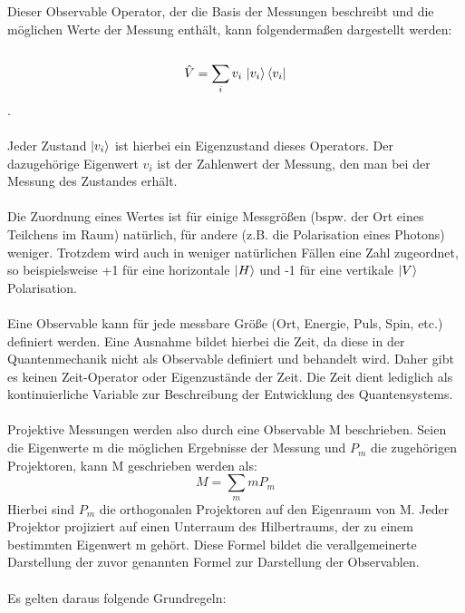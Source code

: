 Dieser Observable Operator, der die Basis der Messungen beschreibt und die möglichen Werte der Messung enthält, kann folgendermaßen dargestellt werden: \\
\\
\begin{equation}
\hat{V} = \sum_i v_i \, \ket{v_i}\bra{v_i}
\end{equation}.
\\ 
\\
Jeder Zustand $\ket{v_i}$ ist hierbei ein Eigenzustand dieses Operators. Der dazugehörige Eigenwert $v_i$ ist der Zahlenwert der Messung, den man bei der Messung des Zustandes erhält. \\ 
\\
Die Zuordnung eines Wertes ist für einige Messgrößen (bspw. der Ort eines Teilchens im Raum) natürlich, für andere (z.B. die Polarisation eines Photons) weniger. Trotzdem wird auch in weniger natürlichen Fällen  eine Zahl zugeordnet, so beispielsweise +1 für eine horizontale $\ket{H}$ und -1 für eine vertikale $\ket{V}$ Polarisation. \\
\\
Eine Observable kann für jede messbare Größe (Ort, Energie, Puls, Spin, etc.) definiert werden. Eine Ausnahme bildet hierbei die Zeit, da diese in der Quantenmechanik nicht als Observable definiert und behandelt wird.
Daher gibt es keinen Zeit-Operator oder Eigenzustände der Zeit. Die Zeit dient lediglich als kontinuierliche Variable zur Beschreibung der Entwicklung des Quantensystems. 
\cite{lvosvsky_quantum_2018} 
\\
\\
Projektive Messungen werden also durch eine Observable M beschrieben. Seien die Eigenwerte m die möglichen Ergebnisse der Messung und $P_m$ die zugehörigen Projektoren, kann M geschrieben werden als:
\begin{equation}
    M = \sum_m mP_m
\end{equation}
Hierbei sind $P_m$ die orthogonalen Projektoren auf den Eigenraum von M. Jeder Projektor projiziert auf einen Unterraum des Hilbertraums, der zu einem bestimmten Eigenwert m gehört. Diese Formel bildet die verallgemeinerte Darstellung der zuvor genannten Formel zur Darstellung der Observablen. \\ %
\\ 
Es gelten daraus folgende Grundregeln: \\ 
